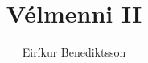 \documentclass{article}
\begin{document}
\title{Vélmenni II}
\author{Eiríkur Benediktsson}
\maketitle
\newpage
\tableofcontents
\newpage



\newpage





\end{document}
